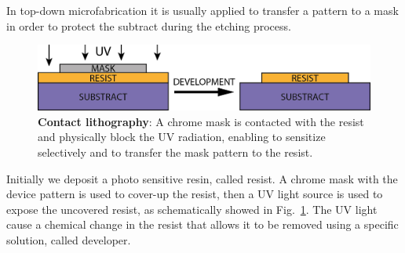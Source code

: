 In top-down microfabrication it is usually applied to transfer a pattern to a mask in order to protect the subtract during the etching process. 
\begin{figure}[!h]
    \centering
    \includegraphics[width = 16cm]{figuras/Dissertation_litho.jpg}
    \caption{\textbf{Contact lithography}: A chrome mask is contacted with the resist and physically block the UV radiation, enabling to sensitize selectively and to transfer the mask pattern to the resist.}
    \label{fig:litho}
\end{figure}

Initially we deposit a photo sensitive resin, called resist. A chrome mask with the device pattern is used to cover-up the resist, then a UV light source is used to expose the uncovered resist, as schematically showed in Fig.~\ref{fig:litho}. The UV light cause a chemical change in the resist that allows it to be removed using a specific solution, called developer. 

